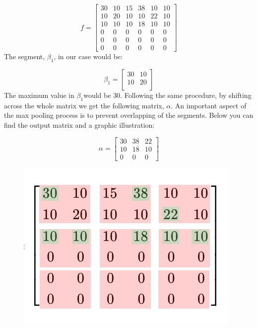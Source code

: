 \documentclass[9pt,onecolumn,oneside]{osajnl}
\begin{document}
\[f =\begin{bmatrix}
30 & 10 & 15 & 38 & 10 & 10\\
10 & 20 & 10 & 10 & 22 & 10\\
10 & 10 & 10 & 18 & 10 & 10\\
0 & 0 & 0 & 0 & 0 & 0\\
0 & 0 & 0 & 0 & 0 & 0\\
0 & 0 & 0 & 0 & 0 & 0
\end{bmatrix} \]
	The segment, \(\beta_{1}\), in our case would be:

\[\beta_{1} =\begin{bmatrix}
30 & 10\\
10 & 20\\
\end{bmatrix} \]
	The maximum value in \(\beta_{1}\)would be \(30\). Following the same procedure, by shifting across the whole matrix we get the following matrix, \(\alpha\). An important aspect of the max pooling process is to prevent overlapping of the segments. Below you can find the output matrix and a graphic illustration:



\[\alpha =\begin{bmatrix}
30 & 38 & 22\\
10 & 18 & 10\\
0 & 0 & 0
\end{bmatrix} \]
\begin{figure}[h]
  \centering
  \begin{minipage}[b]{0.5\textwidth}
  	\centering
    \includegraphics[width=\textwidth]{max-pooling.png}
  \end{minipage}
\end{figure}
\end{document}
